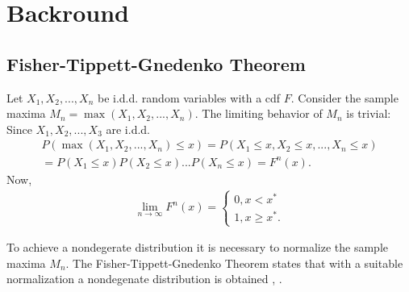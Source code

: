 \documentclass[english,12pt,a4paper,pdftex,sci,utf8]{aaltothesis} %
\newtheorem{definition}[theorem]{Definition}
\begin{document}

\thispagestyle{empty}




\clearpage

\section{Backround}
\label{backround}

\subsection{Fisher-Tippett-Gnedenko Theorem}
\label{domains}

Let $X_1, X_2, ..., X_n$ be i.d.d. random variables with a cdf $F$. Consider the  sample maxima $M_n = \max(X_1, X_2, ..., X_n)$. The limiting behavior of $M_n$ is trivial: Since $X_1, X_2,..., X_3$ are i.d.d.
\begin{gather*}
P(\max(X_1, X_2, ... , X_n) \leq x) = P(X_1 \leq x, X_2 \leq x,..., X_n \leq x) \\ = 
P(X_1 \leq x) P(X_2 \leq x) ... P(X_n \leq x)
=F^n(x).
\end{gather*}
Now,
\begin{gather*}
\lim_{n\to\infty} F^n(x) = 
\begin{cases}
0, x < x^* \\
1, x \geq x^*.
\end{cases}
\end{gather*}



To achieve a nondegerate distribution it is necessary to normalize the sample maxima $M_n$. The Fisher-Tippett-Gnedenko Theorem states that with a suitable normalization a nondegenate distribution is obtained \cite{fisher}, \cite{gnedenko}.
\end{document}
